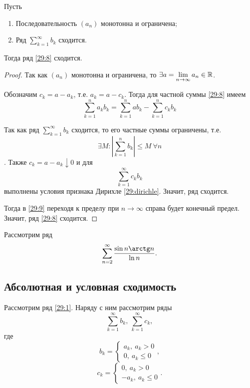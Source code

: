 \documentclass[../../main.tex]{subfiles}
\begin{document}
	\begin{thm}
		Пусть
		\begin{enumerate}
			\item Последовательность $(a_n)$ монотонна и ограничена;
			\item Ряд $\sum\limits_{k = 1}^\infty b_k$ сходится.
		\end{enumerate}
	
		Тогда ряд \eqref{29:8} сходится.
	\end{thm}
	\begin{proof}
		Так как $(a_n)$ монотонна и ограничена, то $\exists a = \lim\limits_{n\to\infty} a_n\in \mathbb{R}$.
		
		Обозначим $c_k = a - a_k$, т.е. $a_k = a - c_k$. Тогда для частной суммы \eqref{29:8} имеем
		\begin{equation}
			\sum_{k = 1}^n a_kb_k = \sum_{k = 1}^n ab_k - \sum_{k = 1}^n c_kb_k
			\label{29:9}
		\end{equation}
		
		Так как ряд $\sum\limits_{k = 1}^\infty b_k$ сходится, то его частные суммы ограничены, т.е. \[\exists M\colon \left|\sum\limits_{k = 1}^n b_k\right|\leqslant M \ \forall n\]. Также $c_k = a - a_k \downarrow 0$ и для 
		\[\sum_{k = 1}^\infty c_kb_k\]
		выполнены условия признака Дирихле \ref{29:dirichle}. Значит, ряд сходится.
		
		Тогда в \eqref{29:9} переходя к пределу при $n\to\infty$ справа будет конечный предел. Значит, ряд \eqref{29:8} сходится.
	\end{proof}
	\begin{example}
		Рассмотрим ряд
		\[\sum_{n = 2}^\infty\frac{\sin n\arctg n}{\ln n}.\]
	\end{example}

	\subsection{Абсолютная и условная сходимость}
	
	Рассмотрим ряд \eqref{29:1}. Наряду с ним рассмотрим ряды 
	\begin{equation}
		\sum\limits_{k = 1}^\infty b_k,\ \sum\limits_{k = 1}^\infty c_k,
		\label{29:10}
	\end{equation} 
	где
	\[b_k = \begin{cases}
		a_k,\ a_{k} > 0\\
		0,\ a_{k}\leqslant0
	\end{cases},\]
	\[c_k = \begin{cases}
		0,\ a_{k} > 0\\
		-a_k,\ a_{k}\leqslant 0
	\end{cases}.\]
	
\end{document}
